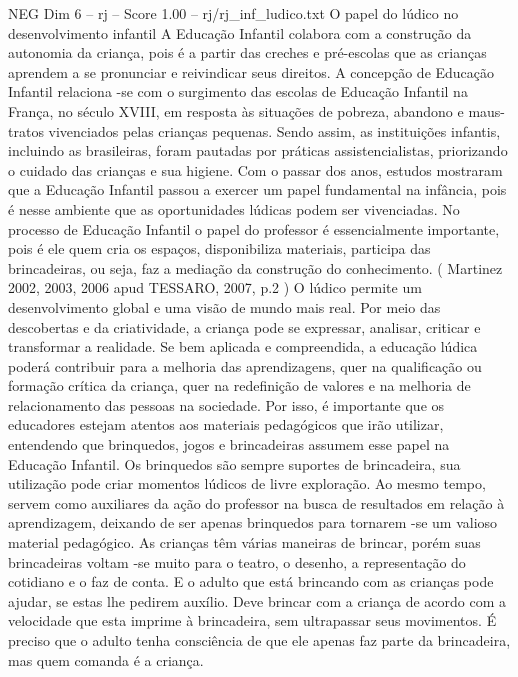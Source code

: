 \begin{textsample}{NEG Dim 6 – rj – Score 1.00 – rj/rj\_inf\_ludico.txt}  \label{ex:f6_neg_006}
O papel do lúdico no desenvolvimento infantil A Educação Infantil colabora com a construção da autonomia da criança, pois é a partir das creches e pré-escolas que as crianças aprendem a se pronunciar e reivindicar seus direitos.
A concepção de Educação Infantil relaciona -se com o surgimento das escolas de Educação Infantil na França, no século XVIII, em resposta às situações de pobreza, abandono e maus-tratos vivenciados pelas crianças pequenas.
Sendo assim, as instituições infantis, incluindo as brasileiras, foram pautadas por práticas assistencialistas, priorizando o cuidado das crianças e sua higiene.
Com o passar dos anos, estudos mostraram que a Educação Infantil passou a exercer um papel fundamental na infância, pois é nesse ambiente que as oportunidades lúdicas podem ser vivenciadas.
No processo de Educação Infantil o papel do professor é essencialmente importante, pois é ele quem cria os espaços, disponibiliza materiais, participa das brincadeiras, ou seja, faz a mediação da construção do conhecimento. ( Martinez 2002, 2003, 2006 apud TESSARO, 2007, p.2 ) O lúdico permite um desenvolvimento global e uma visão de mundo mais real.
Por meio das descobertas e da criatividade, a criança pode se expressar, analisar, criticar e transformar a realidade.
Se bem aplicada e compreendida, a educação lúdica poderá contribuir para a melhoria das aprendizagens, quer na qualificação ou formação crítica da criança, quer na redefinição de valores e na melhoria de relacionamento das pessoas na sociedade.
Por isso, é importante que os educadores estejam atentos aos materiais pedagógicos que irão utilizar, entendendo que brinquedos, jogos e brincadeiras assumem esse papel na Educação Infantil.
Os brinquedos são sempre suportes de brincadeira, sua utilização pode criar momentos lúdicos de livre exploração.
Ao mesmo tempo, servem como auxiliares da ação do professor na busca de resultados em relação à aprendizagem, deixando de ser apenas brinquedos para tornarem -se um valioso material pedagógico.
As crianças têm várias maneiras de brincar, porém suas brincadeiras voltam -se muito para o teatro, o desenho, a representação do cotidiano e o faz de conta.
E o adulto que está brincando com as crianças pode ajudar, se estas lhe pedirem auxílio.
Deve brincar com a criança de acordo com a velocidade que esta imprime à brincadeira, sem ultrapassar seus movimentos.
É preciso que o adulto tenha consciência de que ele apenas faz parte da brincadeira, mas quem comanda é a criança.

\end{textsample}
